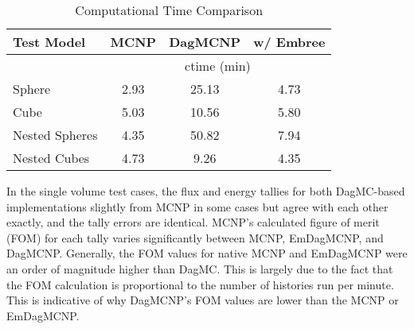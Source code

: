 \documentclass{anstrans}
\begin{document}
\begin{table}[h]

  \begin{center}

      \caption{Computational Time Comparison}
      \label{timings}
    \begin{tabular}{lccc}



      \toprule
      Test Model & MCNP & DagMCNP & w/ Embree \\
      \hline
      &  \multicolumn{3}{c}{ctime (min)} \\
      \hline
      Sphere & 2.93 & 25.13 & 4.73  \\
      Cube & 5.03 & 10.56  & 5.80 \\
      Nested Spheres & 4.35 & 50.82 & 7.94 \\
      Nested Cubes & 4.73 & 9.26 & 4.35 \\
      \bottomrule
      
    \end{tabular}
  \end{center}
  \end{table}

In the single volume test cases, the flux and energy tallies for both DagMC-based implementations slightly from MCNP in some cases but agree with each other exactly, and the tally errors are identical. MCNP's calculated figure of merit (FOM) for each tally varies significantly between MCNP, EmDagMCNP, and DagMCNP. Generally, the FOM values for native MCNP and EmDagMCNP were an order of magnitude higher than DagMC. This is largely due to the fact that the FOM calculation is proportional to the number of histories run per minute. This is indicative of why DagMCNP's FOM values are lower than the MCNP or EmDagMCNP.
\end{document}
